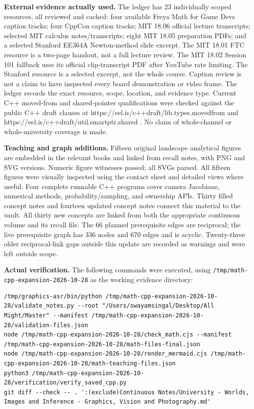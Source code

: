 \textbf{External evidence actually used.} The ledger has 23 individually scoped resources, all reviewed and cached: four available Freya Math for Game Devs caption tracks; four CppCon caption tracks; MIT 18.06 official lecture transcripts; selected MIT calculus notes/transcripts; eight MIT 18.05 preparation PDFs; and a selected Stanford EE364A Newton-method slide excerpt. The MIT 18.01 FTC resource is a two-page handout, not a full lecture review. The MIT 18.02 Session 101 fallback uses its official clip-transcript PDF after YouTube rate limiting. The Stanford resource is a selected excerpt, not the whole course. Caption review is not a claim to have inspected every board demonstration or video frame. The ledger records the exact resource, scope, location, and evidence type. Current C++ moved-from and shared-pointer qualifications were checked against the public C++ draft clauses at https://eel.is/c++draft/lib.types.movedfrom and https://eel.is/c++draft/util.smartptr.shared . No claim of whole-channel or whole-university coverage is made.

\textbf{Teaching and graph additions.} Fifteen original landscape analytical figures are embedded in the relevant books and linked from recall notes, with PNG and SVG versions. Numeric figure witnesses passed; all SVGs parsed. All fifteen figures were visually inspected using the contact sheet and detailed views where useful. Four complete runnable C++ programs cover camera Jacobians, numerical methods, probability/sampling, and ownership APIs. Thirty filled concept notes and fourteen updated concept notes connect this material to the vault. All thirty new concepts are linked from both the appropriate continuous volume and its recall file. The 66 planned prerequisite edges are reciprocal; the live prerequisite graph has 336 nodes and 670 edges and is acyclic. Twenty-three older reciprocal-link gaps outside this update are recorded as warnings and were left outside scope.

\textbf{Actual verification.} The following commands were executed, using \texttt{/tmp/math-cpp-expansion-2026-10-28} as the working evidence directory:

\begin{verbatim}
/tmp/graphics-asr/bin/python /tmp/math-cpp-expansion-2026-10-28/validate_notes.py --root "/Users/swayamsingal/Desktop/All Might/Master" --manifest /tmp/math-cpp-expansion-2026-10-28/validation-files.json
node /tmp/math-cpp-expansion-2026-10-28/check_math.cjs --manifest /tmp/math-cpp-expansion-2026-10-28/math-files-final.json
node /tmp/math-cpp-expansion-2026-10-28/render_mermaid.cjs /tmp/math-cpp-expansion-2026-10-28/math-teaching-files.json
python3 /tmp/math-cpp-expansion-2026-10-28/verification/verify_saved_cpp.py
git diff --check -- . ':(exclude)Continuous Notes/University - Worlds, Images and Inference - Graphics, Vision and Photography.md'
\end{verbatim}

